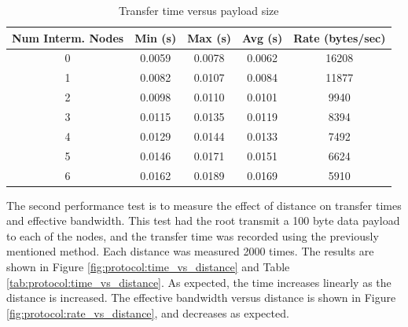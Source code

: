 \begin{table}
	\begin{center}
		\setlength{\extrarowheight}{1.5pt}
		\caption{Transfer time versus payload size}
		\vspace{0.1cm}
		\begin{tabular} {|c|c|c|c|c|}
			\hline
			\textbf{Num Interm. Nodes} & \textbf{Min (s)} & \textbf{Max (s)} & \textbf{Avg (s)} & \textbf{Rate (bytes/sec)} \\
			\hline
			\hline
			0 & 0.0059 & 0.0078 & 0.0062 & 16208 \\
			\hline
			1 & 0.0082 & 0.0107 & 0.0084 & 11877 \\
			\hline
			2 & 0.0098 & 0.0110 & 0.0101 & 9940 \\
			\hline
			3 & 0.0115 & 0.0135 & 0.0119 & 8394 \\
			\hline
			4 & 0.0129 & 0.0144 & 0.0133 & 7492 \\
			\hline
			5 & 0.0146 & 0.0171 & 0.0151 & 6624 \\
			\hline
			6 & 0.0162 & 0.0189 & 0.0169 & 5910 \\
			\hline
		\end{tabular}
		\label{tab:protocol:time_vs_size}
	\end{center}
\end{table}

The second performance test is to measure the effect of distance on transfer times and effective bandwidth. This test had the root transmit a 100 byte data payload to each of the nodes, and the transfer time was recorded using the previously mentioned method. Each distance was measured 2000 times. The results are shown in Figure \ref{fig:protocol:time_vs_distance} and Table \ref{tab:protocol:time_vs_distance}. As expected, the time increases linearly as the distance is increased. The effective bandwidth versus distance is shown in Figure \ref{fig:protocol:rate_vs_distance}, and decreases as expected.

